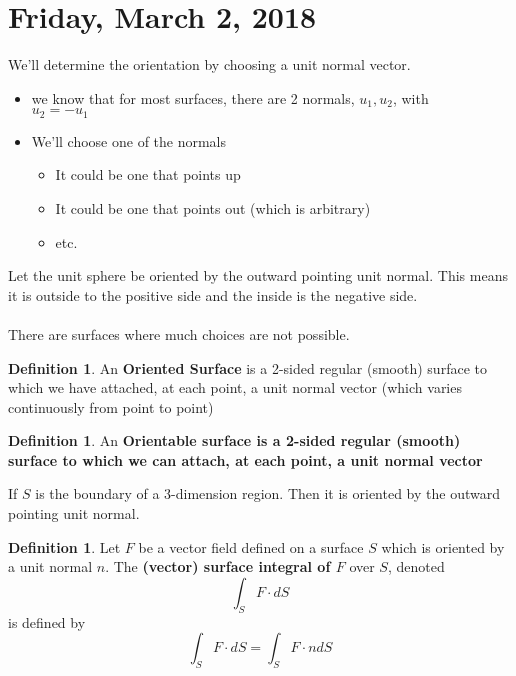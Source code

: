 \documentclass[12pt]{article}
\theoremstyle{plain}
\theoremstyle{definition}
\newtheorem{definition}[theorem]{Definition}
\begin{document}
\section{Friday, March 2, 2018}

We'll determine the orientation by choosing a unit normal vector.
\begin{itemize}
	\item{we know that for most surfaces, there are 2 normals, $u_1, u_2$, with\\ $u_2 = -u_1$}
	\item{We'll choose one of the normals}
	\begin{itemize}
		\item{It could be one that points up}
		\item{It could be one that points out (which is arbitrary)}
		\item{etc.}
	\end{itemize}
\end{itemize}

Let the unit sphere be oriented by the outward pointing unit normal. This means it is outside to the positive side and the inside is the negative side.\\
\\
There are surfaces where much choices are not possible.

\begin{definition}
	An \textbf{Oriented Surface} is a 2-sided regular (smooth) surface to which we have attached, at each point, a unit normal vector (which varies continuously from point to point)
\end{definition}

\begin{definition}
	An \textbf{Orientable surface is a 2-sided regular (smooth) surface to which we can attach, at each point, a unit normal vector}
\end{definition}

If $S$ is the boundary of a 3-dimension region. Then it is oriented by the outward pointing unit normal.

\begin{definition}
	Let $F$ be a vector field defined on a surface $S$ which is oriented by a unit normal $n$. The \textbf{(vector) surface integral of $F$} over $S$, denoted
	$$\int_S F \cdot dS$$
	is defined by
	$$\int_S F \cdot dS = \int_S F \cdot n dS$$
\end{definition}
\end{document}

